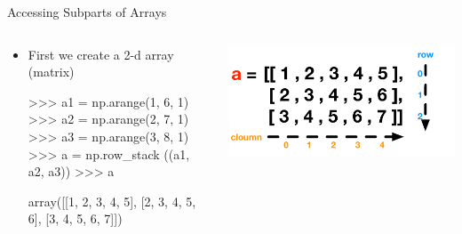 \documentclass[aspectratio=169]{beamer}
\begin{document}
\begin{frame}[fragile]{Accessing Subparts of Arrays}

\begin{columns}
\begin{column}{0.5\textwidth}	


\begin{itemize}
\item First we create a 2-d array (matrix)

\begin{SQL}
>>> a1 = np.arange(1, 6, 1)
>>> a2 = np.arange(2, 7, 1)
>>> a3 = np.arange(3, 8, 1)
>>> a = np.row_stack ((a1, a2, a3))
>>> a

array([[1, 2, 3, 4, 5],
       [2, 3, 4, 5, 6],
       [3, 4, 5, 6, 7]])
\end{SQL}

\end{itemize}
\end{column}

\begin{column}{0.5\textwidth}
{\centering\includegraphics[width=1\textwidth]{./lectPython/Canvas02.pdf}\par}	
\end{column}

\end{columns}
\end{frame}
\end{document}

